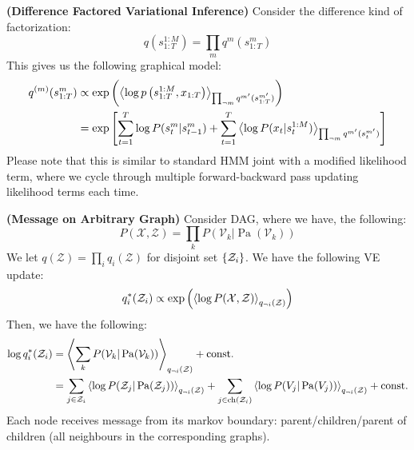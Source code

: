 \begin{remark}{\textbf{(Difference Factored Variational Inference)}}
    Consider the difference kind of factorization:
    \begin{equation*}
        q(s^{1:M}_{1:T}) = \prod_m q^m(s^m_{1:T})
    \end{equation*}
    This gives us the following graphical model:
    \begin{equation*}
    \begin{aligned}
        q^{(m)}(s^m_{1:T}) &\propto \exp\left( \left\langle \log p\left( s^{1:M}_{1:T}, x_{1:T} \right) \right\rangle_{\prod_{\neg m}q^{m'}(s^{m'}_{1:T})} \right) \\
        &= \exp\left[  \sum_{t=1}^T \log P(s^m_t | s^m_{t-1}) + \sum_{t=1}^T \left\langle \log P(x_t | s_t^{1:M}) \right\rangle_{\prod_{\neg m}q^{m'}(s^{m'}_t)}  \right]
    \end{aligned}
    \end{equation*}
    Please note that this is similar to standard HMM joint with a modified likelihood term, where we cycle through multiple forward-backward pass updating likelihood terms each time. 
\end{remark}

\begin{remark}{\textbf{(Message on Arbitrary Graph)}}
    Consider DAG, where we have, the following:
    \begin{equation*}
        P(\mathcal{X}, \mathcal{Z}) = \prod_k P(\mathcal{V}_k | \operatorname{Pa}(\mathcal{V}_k))
    \end{equation*}
    We let $q(\mathcal{Z}) = \prod_i q_i(\mathcal{Z})$ for disjoint set $\left\{ \mathcal{Z}_i \right\}$. We have the following VE update:
    \begin{equation*}
        q^*_i(\mathcal{Z}_i) \propto \exp\left( \left\langle \log P(\mathcal{X}, \mathcal{Z}) \right\rangle_{q_{\neg i}(\mathcal{Z})}  \right)
    \end{equation*}
    Then, we have the following:
    \begin{equation*}
    \begin{aligned}
        \log q^*_i(\mathcal{Z}_i) &= \left\langle \sum_k P(\mathcal{V}_k | \operatorname{Pa}(\mathcal{V}_k)) \right\rangle_{q_{\neg i}(\mathcal{Z})} + \text{const.} \\
        &= \sum_{j\in\mathcal{Z}_i} \left\langle  \log P(\mathcal{Z}_j | \operatorname{Pa}(\mathcal{Z}_j))  \right\rangle_{q_{\neg i}(\mathcal{Z})} + \sum_{j\in\operatorname{ch}(\mathcal{Z}_i)}\left\langle \log P(V_j | \operatorname{Pa}(V_j)) \right\rangle_{q_{\neg i}(\mathcal{Z})} + \text{const.}
    \end{aligned}
    \end{equation*}
    Each node receives message from its markov boundary: parent/children/parent of children (all neighbours in the corresponding graphs).
\end{remark}

